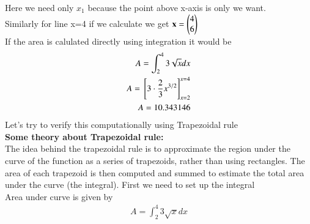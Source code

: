 \documentclass[journal]{IEEEtran}
\numberwithin{equation}{enumi}
\numberwithin{figure}{enumi}
\begin{document}
Here we need only $x_1$ because the point above x-axis is only we want.\\
Similarly for line x=4 if we calculate we get $\mathbf{x}=\begin{pmatrix}4\\6\end{pmatrix}$\\
If the area is calulated directly using integration it would be 
\begin{align}
     A= \int_{2}^{4} 3\sqrt{x}dx\\
     A={}\left[3\cdot \frac{2}{3} x^{3/2}\right]_{x=2}^{x=4}\\
     A =10.343146
\end{align}
Let's try to verify this computationally using Trapezoidal rule\\
\textbf{Some theory about Trapezoidal rule:}\\
The idea behind the trapezoidal rule is to approximate the region under the curve of the function as a series of trapezoids, rather than using rectangles. The area of each trapezoid is then computed and summed to estimate the total area under the curve (the integral).
First we need to set up the integral\\
Area under curve is given by
\begin{align}
    A= \int_{2}^{4} 3\sqrt{x}dx
\end{align}
\end{document}

